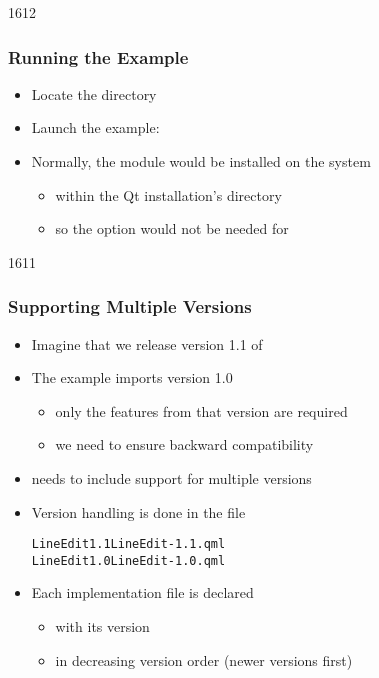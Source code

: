 
\begin{slide}{1612}\frametitle{Running the Example}

\begin{itemize}
\item Locate the  directory
\item Launch the example:\\
\end{itemize}

\begin{itemize}
\item Normally, the module would be installed on the system
  \begin{itemize}
  \item within the Qt installation's  directory
  \item so the  option would not be needed for 
  \end{itemize}
\end{itemize}

\end{slide}


\begin{slide}{1611}\frametitle{Supporting Multiple Versions}

\begin{itemize}
\item Imagine that we release version 1.1 of 
\item The example imports version 1.0
  \begin{itemize}
  \item only the features from that version are required
  \item we need to ensure backward compatibility
  \end{itemize}
\item {} needs to include support for multiple versions
\item Version handling is done in the  file

\begin{alltt}
LineEdit 1.1 LineEdit-1.1.qml\\
LineEdit 1.0 LineEdit-1.0.qml
\end{alltt}

\item Each implementation file is declared
  \begin{itemize}
  \item with its version
  \item in decreasing version order (newer versions first)
  \end{itemize}
\end{itemize}

\end{slide}

